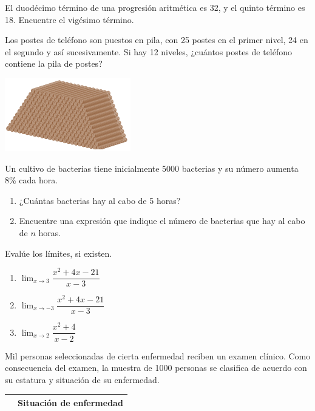 \documentclass[letterpaper,fleqn]{article}
\let\ds\displaystyle
\begin{document}
\begin{enumerate}
\begin{enumerate}
\begin{multicols}{2}
\end{multicols}
\end{enumerate}
\item El duodécimo término de una progresión aritmética es 32, y el quinto término es 18. Encuentre el vigésimo término.\noanswer
\begin{minipage}{.45\textwidth}
\item Los postes de teléfono son puestos en pila, con 25 postes en el primer nivel, 24 en el segundo y así sucesivamente. Si hay 12 niveles, ¿cuántos postes de teléfono contiene la pila de postes?
\end{minipage}\hfill
\begin{minipage}{.45\textwidth}
\includegraphics[scale=.9]{Images/postes.png} 
\end{minipage}
\noanswer
\item Un cultivo de bacterias tiene inicialmente 5000 bacterias y su número aumenta 8\% cada hora. 
\begin{enumerate}
\item ¿Cuántas bacterias hay al cabo de 5 horas?\noanswer
\item Encuentre una expresi\'{o}n que indique el n\'{u}mero de bacterias que hay al cabo de $n$ horas.\noanswer
\end{enumerate}
\item Evalúe los límites, si existen.
\begin{enumerate}
\item $\ds{\lim_{x\rightarrow 3}\dfrac{x^{2}+4x-21}{x-3}}$\noanswer
\item $\ds{\lim_{x\rightarrow -3}\dfrac{x^{2}+4x-21}{x-3}}$\noanswer
\item $\ds{\lim_{x\rightarrow 2}\dfrac{x^{2}+4}{x-2}}$\noanswer
\end{enumerate} 
\item Mil personas seleccionadas de cierta enfermedad reciben un examen clínico. Como consecuencia del examen, la muestra de 1000 personas se clasifica de acuerdo con su estatura y situaci\'{o}n de su enfermedad.
\begin{center}
\begin{tabular}{lccccc}
 & \multicolumn{5}{c}{Situación de enfermedad} \\ \hline 

\end{tabular}
\end{center}
\end{enumerate}
\end{document}
